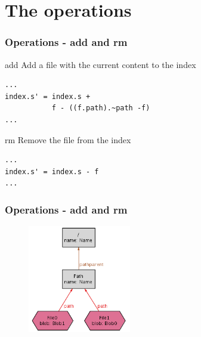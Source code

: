 \documentclass{beamer}
\begin{document}



\section{The operations}
\begin{frame}[fragile]
   \frametitle{Operations - add and rm}
   \begin{block}{add}
      Add a file with the current content to the index
   \end{block}
   \tiny
   \begin{lstlisting}
...
index.s' = index.s + 
           f - ((f.path).~path -f)
...   
   \end{lstlisting}
   \normalsize
   \begin{block}{rm}
      Remove the file from the index
   \end{block}
   \tiny
   \begin{lstlisting}
...
index.s' = index.s - f
...
   \end{lstlisting}
\end{frame}

\begin{frame}[fragile]
   \frametitle{Operations - add and rm}
   \begin{figure}
      \centering
      \includegraphics[width=0.4\textwidth]{images/add1.png}
   \end{figure}
\end{frame}
\end{document}
